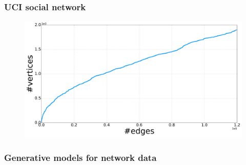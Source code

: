 \documentclass[final,hyperref={pdfpagelabels=false},noamsthm]{beamer}
\begin{document}
\begin{frame}
	\frametitle{UCI social network}
	\begin{figure}[h]
		\includegraphics[width=1.0\textwidth]{fig/n_CollegeMsg_arrival.pdf}
	\end{figure}
\end{frame}

%	
%	


\begin{frame}
	\frametitle{Generative models for network data}
	\begin{center}
	\end{center}
\end{frame}


\end{document}
